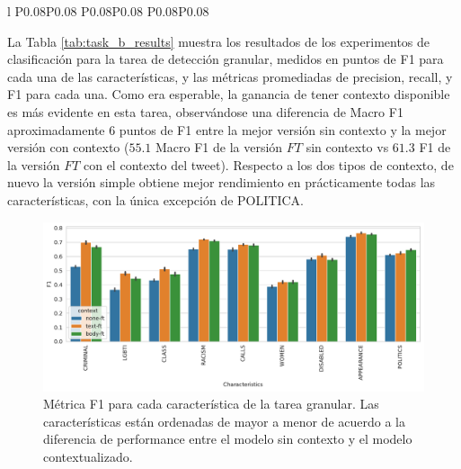 \begin{table}
\begin{tabular}{l P{0.08\textwidth}P{0.08\textwidth} P{0.08\textwidth}P{0.08\textwidth}  P{0.08\textwidth}P{0.08\textwidth}}
        \bottomrule
        \end{tabular}
    \caption{Resultados de los experimentos de clasificación para la tarea \emph{granular} de detección de discurso de odio, expresados como la media de las distintas métricas sobre diez corridas independientes. Cada modelo es un BERT con tres posibles entradas: sólo el comentario (\emph{Sin contexto}), el tweet de la noticia a la cual responde el comentario (\emph{Tweet}), y el tweet más el cuerpo de la noticia (\emph{Tweet + Cuerpo}). Para cada una de estas posibilidades usamos dos versiones: una sobre BETO($\neg$FT) y otra sobre BETO ajustado al dominio (FT) de acuerdo a lo descripto en la sección \ref{sec:contextualized_classifiers}}
    \label{tab:task_b_results}
\end{table}



La Tabla \ref{tab:task_b_results} muestra los resultados de los experimentos de clasificación para la tarea de detección granular, medidos en puntos de F1 para cada una de las características, y las métricas promediadas de precision, recall, y F1 para cada una. Como era esperable, la ganancia de tener contexto disponible es más evidente en esta tarea, observándose una diferencia de Macro F1 aproximadamente 6 puntos de F1 entre la mejor versión sin contexto y la mejor versión con contexto ($55.1$ Macro F1 de la versión $FT$ sin contexto vs $61.3$ F1 de la versión $FT$ con el contexto del tweet). Respecto a los dos tipos de contexto, de nuevo la versión simple obtiene mejor rendimiento en prácticamente todas las características, con la única excepción de POLITICA.


\begin{figure}[]
    \centering
    \includegraphics[width=\textwidth]{img/task_b_scores.pdf}
    \caption{Métrica F1 para cada característica de la tarea granular. Las características están ordenadas de mayor a menor de acuerdo a la diferencia de performance entre el modelo sin contexto y el modelo contextualizado. }
    \label{fig:barplot_task_b_results}
\end{figure}

